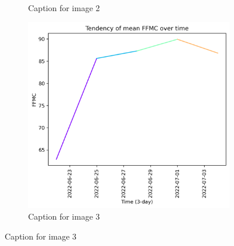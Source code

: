 \begin{figure}[h]
\begin{subfigure}{0.3\textwidth}
        \caption{Caption for image 2}
        \label{fig:img2}
    \end{subfigure}
    \hfill
    \begin{subfigure}{0.3\textwidth}
        \centering
        \includegraphics[width=\textwidth]{graphs/2022/tendency/2022_tendency_graph_FFMC.png}
        \caption{Caption for image 3}
        \label{fig:img3}
    \end{subfigure}
    
    \label{fig:all_images}
\end{figure}

